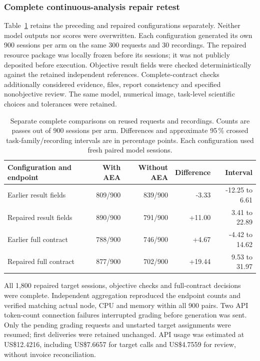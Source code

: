 \subsubsection*{Complete continuous-analysis repair retest}
\label{si:repair-validation}

Table~\ref*{tab:repair-validation} retains the preceding and repaired configurations separately. Neither model outputs nor scores were overwritten. Each configuration generated its own 900 sessions per arm on the same 300 requests and 30 recordings. The repaired resource package was locally frozen before its sessions; it was not publicly deposited before execution. Objective result fields were checked deterministically against the retained independent references. Complete-contract checks additionally considered evidence, files, report consistency and specified nonobjective review. The same model, numerical image, task-level scientific choices and tolerances were retained.

\begin{table}[!htbp]
\centering\small
\caption{Separate complete comparisons on reused requests and recordings. Counts are passes out of 900 sessions per arm. Differences and approximate 95\,\% crossed task-family/recording intervals are in percentage points. Each configuration used fresh paired model sessions.}
\label{tab:repair-validation}
\begin{tabular}{lrrrr}
\toprule
Configuration and endpoint & With AEA & Without AEA & Difference & Interval \\
\midrule
Earlier result fields & 809/900 & 839/900 & -3.33 & -12.25 to 6.61 \\
Repaired result fields & 890/900 & 791/900 & +11.00 & 3.41 to 22.89 \\
Earlier full contract & 788/900 & 746/900 & +4.67 & -4.42 to 14.62 \\
Repaired full contract & 877/900 & 702/900 & +19.44 & 9.53 to 31.97 \\
\bottomrule
\end{tabular}
\end{table}

All 1,800 repaired target sessions, objective checks and full-contract decisions were complete. Independent aggregation reproduced the endpoint counts and verified matching actual node, CPU and memory within all 900 pairs. Two API token-count connection failures interrupted grading before generation was sent. Only the pending grading requests and unstarted target assignments were resumed; first deliveries were retained unchanged. API usage was estimated at US\$12.4216, including US\$7.6657 for target calls and US\$4.7559 for review, without invoice reconciliation.

